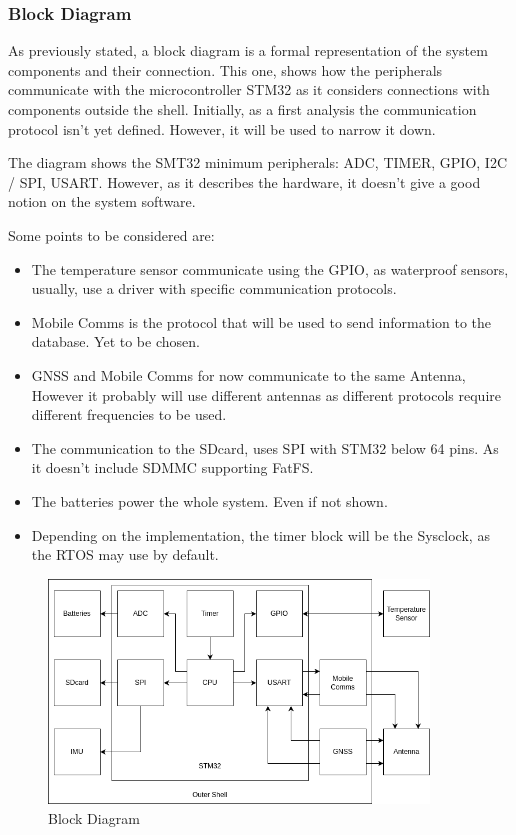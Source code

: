 \subsubsection{Block Diagram}

As previously stated, a block diagram is a formal representation of the system components
and their connection. This one, shows how the peripherals communicate with the microcontroller STM32
as it considers connections with components outside the shell. Initially, as a first analysis
the communication protocol isn't yet defined. However, it will be used to narrow it down.

The diagram shows the SMT32 minimum peripherals: ADC, TIMER, GPIO, I2C / SPI, USART. However,
as it describes the hardware, it doesn't give a good notion on the system software. 

Some points to be considered are:
\begin{itemize}
    \item The temperature sensor communicate using the GPIO, as waterproof sensors, usually, use a driver with specific
    communication protocols.
    \item Mobile Comms is the protocol that will be used to send information to the database. Yet to be chosen. 
    \item GNSS and Mobile Comms for now communicate to the same Antenna, However it probably will use different antennas as different
    protocols require different frequencies to be used.
    \item The communication to the SDcard, uses SPI with STM32 below 64 pins. As it 
    doesn't include SDMMC supporting FatFS.
    \item The batteries power the whole system. Even if not shown.
    \item Depending on the implementation, the timer block will be the Sysclock, as 
    the RTOS may use by default.
\end{itemize}

\begin{figure}[H]
    \centering
    \includegraphics[width=0.9\textwidth]{images/diagrams/block_diagram/block_diagrams_3/blockdiagram_analysis.drawio.png}  %
    \caption{Block Diagram}
    \label{fig:Block Diagram}        
\end{figure}

